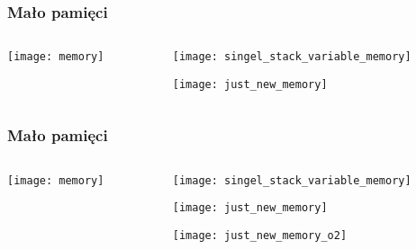 \documentclass{beamer}
\begin{document}
\begin{frame}[t]
    \frametitle{Mało pamięci}
    \begin{columns}[t]
        \begin{column}{0.5\textwidth}
            \begin{center}
                \texttt{[image: memory]}\\
                \tiny \cite{memory} 
            \end{center}
        \end{column}
        \begin{column}[t]{0.5\textwidth}
            \begin{center}
                \texttt{[image: singel\_stack\_variable\_memory]}

                \vspace{5 mm}

                \texttt{[image: just\_new\_memory]}
            \end{center}
        \end{column}
    \end{columns}
\end{frame}
\begin{frame}[t]
    \frametitle{Mało pamięci}
    \begin{columns}[t]
        \begin{column}{0.5\textwidth}
            \begin{center}
                \texttt{[image: memory]}\\
                \tiny \cite{memory} 
            \end{center}
        \end{column}
        \begin{column}[t]{0.5\textwidth}
            \begin{center}
                \texttt{[image: singel\_stack\_variable\_memory]}

                \vspace{5 mm}

                \texttt{[image: just\_new\_memory]}

                \vspace{5 mm}

                \texttt{[image: just\_new\_memory\_o2]}
            \end{center}
        \end{column}
    \end{columns}
\end{frame}
\end{document}
